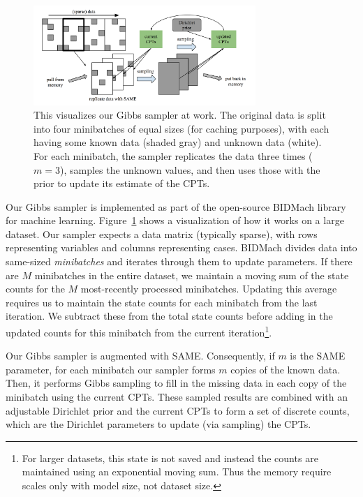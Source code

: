 \documentclass{article} %
\begin{document}
\begin{figure}[t]
\centering
\includegraphics[width=0.75\textwidth]{fig_BIDMach_final}
\caption{This visualizes our Gibbs sampler at work. The original data is split into four
minibatches of equal sizes (for caching purposes), with each having some known data (shaded gray)
and unknown data (white). For each minibatch, the sampler replicates the data three times ($m=3$),
samples the unknown values, and then uses those with the prior to update its estimate of the CPTs.}
\label{fig:BIDMach}
\end{figure}

Our Gibbs sampler is implemented as part of the open-source BIDMach library~\citep{bidmach} for
machine learning.  Figure~\ref{fig:BIDMach} shows a visualization of how it works on a large dataset.
Our sampler expects a data matrix (typically sparse), with rows representing variables and columns
representing cases. BIDMach divides data into same-sized \emph{minibatches} and iterates through
them to update parameters. If there are $M$ minibatches in the entire dataset, we maintain a moving
sum of the state counts for the $M$ most-recently processed minibatches. Updating this average requires 
us to maintain the state counts for each minibatch from the last iteration. We subtract these from
the total state counts before adding in the updated counts for this minibatch from the current
iteration\footnote{For larger datasets, this state is not saved and instead the counts are
maintained using an exponential moving sum. Thus the memory require scales only with model size, not
dataset size.}.

Our Gibbs sampler is augmented with SAME. Consequently, if $m$ is the SAME parameter, for each
minibatch our sampler forms $m$ copies of the known data.  Then, it performs Gibbs sampling to fill
in the missing data in each copy of the minibatch using the current CPTs.  These sampled results
are combined with an adjustable Dirichlet prior and the current CPTs to form a set of discrete
counts, which are the Dirichlet parameters to update (via sampling) the CPTs. 
\end{document}
